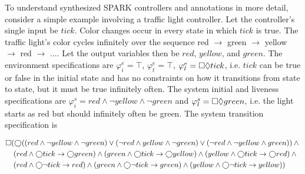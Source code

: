 \documentclass[runningheads]{llncs}
\begin{document}
To understand synthesized SPARK controllers and annotations in more detail, consider a simple example involving a traffic light controller. 
Let the controller's single input be $tick$. 
Color changes occur in every state in which $tick$ is true.
The traffic light's color cycles infinitely over the sequence red $\rightarrow$ green $\rightarrow$ yellow $\rightarrow$ red $\rightarrow$ $\ldots$.
Let the output variables then be $red$, $yellow$, and $green$.
The environment specifications are $\varphi^e_i = \top$, $\varphi^e_t = \top$, $\varphi^e_l = \square \lozenge tick$, i.e.  
$tick$ can be true or false in the initial state and has no constraints on how it transitions from state to state, but it must be true infinitely often.
The system initial and liveness specifications are $\varphi^s_i = red \land \lnot yellow \land \lnot green$ and $\varphi^s_l =  \square \lozenge green$, i.e.
the light starts as red but should infinitely often be green. The system transition specification is

{\scriptsize
\begin{align}
\square & (\varbigcirc ( (red \land \lnot yellow \land \lnot green) \lor (\lnot red \land yellow \land \lnot green) \lor (\lnot red \land \lnot yellow \land green)) \land \mbox{}  \label{eq:mutex} \\
	& \; (red \land \varbigcirc tick \rightarrow \varbigcirc green) \land (green \land \varbigcirc tick \rightarrow \varbigcirc yellow) \land (yellow \land \varbigcirc tick \rightarrow \varbigcirc red) \land \mbox{}  \label{eq:change} \\
	& \; (red \land \varbigcirc \lnot tick \rightarrow red) \land (green \land \varbigcirc \lnot tick \rightarrow green) \land (yellow \land \varbigcirc \lnot tick \rightarrow yellow) \label{eq:same})
\end{align}
}
\end{document}
